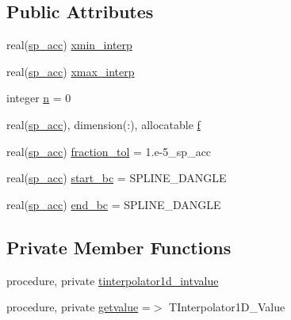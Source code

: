 \subsection*{Public Attributes}
\begin{DoxyCompactItemize}
\item 
real(\mbox{\hyperlink{namespaceinterpolation_af72aa9a05feb8ef90b2d26e4a013abf3}{sp\+\_\+acc}}) \mbox{\hyperlink{structinterpolation_1_1tinterpolator1d_ae24270e99e0ad73aeb6332a61122a69f}{xmin\+\_\+interp}}
\item 
real(\mbox{\hyperlink{namespaceinterpolation_af72aa9a05feb8ef90b2d26e4a013abf3}{sp\+\_\+acc}}) \mbox{\hyperlink{structinterpolation_1_1tinterpolator1d_a32bdb3dfdb0c3888f0600933db548496}{xmax\+\_\+interp}}
\item 
integer \mbox{\hyperlink{structinterpolation_1_1tinterpolator1d_a7b78bf0b7a736b1b8b2b4be3ab9ae949}{n}} = 0
\item 
real(\mbox{\hyperlink{namespaceinterpolation_af72aa9a05feb8ef90b2d26e4a013abf3}{sp\+\_\+acc}}), dimension(\+:), allocatable \mbox{\hyperlink{structinterpolation_1_1tinterpolator1d_a67112a921a96fb5327431ead574a0032}{f}}
\item 
real(\mbox{\hyperlink{namespaceinterpolation_af72aa9a05feb8ef90b2d26e4a013abf3}{sp\+\_\+acc}}) \mbox{\hyperlink{structinterpolation_1_1tinterpolator1d_a16e2a53e2f762a89e921b47c09b5efab}{fraction\+\_\+tol}} = 1.e-\/5\+\_\+sp\+\_\+acc
\item 
real(\mbox{\hyperlink{namespaceinterpolation_af72aa9a05feb8ef90b2d26e4a013abf3}{sp\+\_\+acc}}) \mbox{\hyperlink{structinterpolation_1_1tinterpolator1d_a89bb04409d4b0eb2641a386d37405664}{start\+\_\+bc}} = S\+P\+L\+I\+N\+E\+\_\+\+D\+A\+N\+G\+LE
\item 
real(\mbox{\hyperlink{namespaceinterpolation_af72aa9a05feb8ef90b2d26e4a013abf3}{sp\+\_\+acc}}) \mbox{\hyperlink{structinterpolation_1_1tinterpolator1d_a103246ea154b2ac29b65f270e078e3a7}{end\+\_\+bc}} = S\+P\+L\+I\+N\+E\+\_\+\+D\+A\+N\+G\+LE
\end{DoxyCompactItemize}
\subsection*{Private Member Functions}
\begin{DoxyCompactItemize}
\item 
procedure, private \mbox{\hyperlink{structinterpolation_1_1tinterpolator1d_a07c4f3b0afea2911b57b6c900387e5cf}{tinterpolator1d\+\_\+intvalue}}
\item 
procedure, private \mbox{\hyperlink{structinterpolation_1_1tinterpolator1d_acd1e46c03d808d5748b98eae2915225f}{getvalue}} =$>$ T\+Interpolator1\+D\+\_\+\+Value
\end{DoxyCompactItemize}
